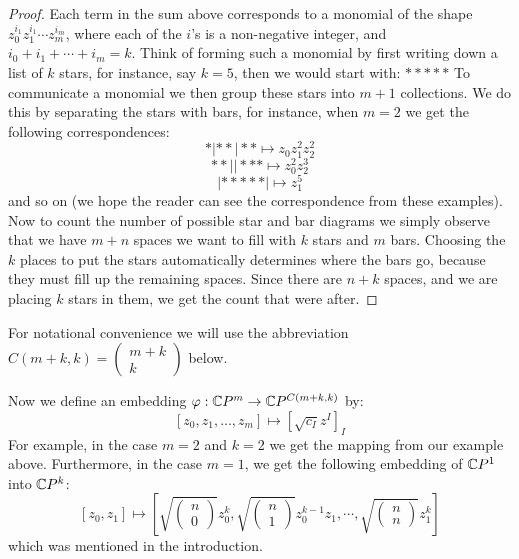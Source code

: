 \begin{proof} Each term in the sum above corresponds to a monomial of the shape $z_0^{i_1} z_1^{i_1} \cdots z_m^{i_m}$, where each of the $i$'s is a non-negative integer, and $i_0 + i_1 + \cdots + i_m = k$. Think of forming such a monomial by first writing down a list of $k$ stars, for instance, say $k=5$, then we would start with:
%
$\ast \ast \ast \ast \ast$
%
To communicate a monomial we then group these stars into $m+1$ collections.  We do this by separating the stars with bars, for instance, when $m=2$ we get the following correspondences:  
%
$$ *|**|** \mapsto z_0 z_1^2 z_2^2 $$
$$ **||*** \mapsto z_0^2 z_2^3 $$
$$ |*****| \mapsto z_1^5 $$
%
and so on (we hope the reader can see the correspondence from these examples).  Now to count the number of possible star and bar diagrams we simply observe that we have $m+n$ spaces we want to fill with $k$ stars and $m$ bars.  Choosing the $k$ places to put the stars automatically determines where the bars go, because they must fill up the remaining spaces.  Since there are $n+k$ spaces, and we are placing $k$ stars in them, we get the count that were after.
\end{proof}

For notational convenience we will use the abbreviation $C(m+k,k) = \left( \begin{array}{c} m + k \\ k \end{array} \right)$ below.

Now we define an embedding $\varphi : \mathbb{C}P^m \rightarrow \mathbb{C}P^{C(m+k,k)}$ by:
%
$$ [z_0, z_1, \ldots, z_m ] \mapsto [ \sqrt{ c_I } z^I ]_{I} $$
%
For example, in the case $m=2$ and $k=2$ we get the mapping from our example above.  Furthermore, in the case $m=1$, we get the following embedding of $\mathbb{C}P^1$ into $\mathbb{C}P^k$:
%
$$ [z_0, z_1] \mapsto \left[ \sqrt{ \left( \begin{array}{c} n \\ 0 \end{array} \right) } z_0^k, \sqrt{ \left( \begin{array}{c} n \\ 1 \end{array} \right) } z_0^{k-1} z_1, \cdots, \sqrt{ \left( \begin{array}{c} n \\ n \end{array} \right) } z_1^k \right] $$ 
%
which was mentioned in the introduction.

